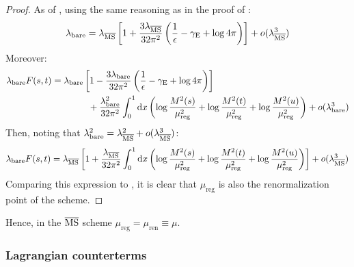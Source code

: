 \begin{proofbox}
  \begin{proof}
    As of , using the same reasoning as in the proof of :
    \begin{equation}
      \lambda_\text{bare} = \lambda_{\overline{\text{MS}}} \left[ 1 + \frac{3\lambda_{\overline{\text{MS}}}}{32\pi^2} \left( \frac{1}{\epsilon} - \gamma_\text{E} + \log 4\pi \right) \right] + o(\lambda_{\overline{\text{MS}}}^3)
    \end{equation}
    Moreover:
    \begin{equation*}
      \begin{split}
        \lambda_\text{bare} F(s,t)
        & = \lambda_\text{bare} \left[ 1 - \frac{3\lambda_\text{bare}}{32\pi^2} \left( \frac{1}{\epsilon} - \gamma_\text{E} + \log 4\pi \right) \right] \\
        & \qquad \qquad  + \frac{\lambda_\text{bare}^2}{32\pi^2} \int_0^1 \mathrm{d} x \left( \log \frac{M^2(s)}{\mu_\text{reg}^2} + \log \frac{M^2(t)}{\mu_\text{reg}^2} + \log \frac{M^2(u)}{\mu_\text{reg}^2} \right) + o(\lambda_\text{bare}^3) \\
      \end{split}
    \end{equation*}
    Then, noting that $ \lambda_\text{bare}^2 = \lambda_{\overline{\text{MS}}}^2 + o(\lambda_{\overline{\text{MS}}}^3) $:
    \begin{equation*}
      \lambda_\text{bare} F(s,t) = \lambda_{\overline{\text{MS}}} \left[ 1 + \frac{\lambda_{\overline{\text{MS}}}}{32\pi^2} \int_0^1 \mathrm{d} x \left( \log \frac{M^2(s)}{\mu_\text{reg}^2} + \log \frac{M^2(t)}{\mu_\text{reg}^2} + \log \frac{M^2(u)}{\mu_\text{reg}^2} \right) \right] + o(\lambda_{\overline{\text{MS}}}^3)
    \end{equation*}
    Comparing this expression to , it is clear that $ \mu_\text{reg} $ is also the renormalization point of the scheme.
  \end{proof}
\end{proofbox}

Hence, in the $ \overline{\text{MS}} $ scheme $ \mu_\text{reg} = \mu_\text{ren} \equiv \mu $.

\subsubsection{Lagrangian counterterms}
\label{sssec:lag-count}

